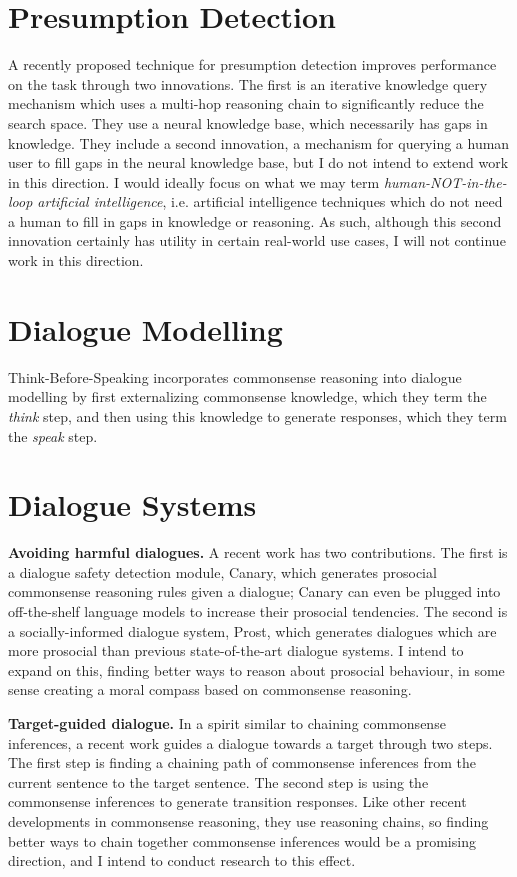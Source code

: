 \documentclass[12pt]{report}
\begin{document}
\section{Presumption Detection}

A recently proposed technique for presumption detection \cite{Arabshahi2021-ly} improves performance on the task through two innovations.
The first is an iterative knowledge query mechanism which uses a multi-hop reasoning chain to significantly reduce the search space.
They use a neural knowledge base, which necessarily has gaps in knowledge.
They include a second innovation, a mechanism for querying a human user to fill gaps in the neural knowledge base, but I do not intend to extend work in this direction.
I would ideally focus on what we may term \textit{human-NOT-in-the-loop artificial intelligence}, i.e. artificial intelligence techniques which do not need a human to fill in gaps in knowledge or reasoning.
As such, although this second innovation certainly has utility in certain real-world use cases, I will not continue work in this direction.

\section{Dialogue Modelling}

Think-Before-Speaking \cite{Zhou2021-iy} incorporates commonsense reasoning into dialogue modelling by first externalizing commonsense knowledge, which they term the \textit{think} step, and then using this knowledge to generate responses, which they term the \textit{speak} step.

\section{Dialogue Systems}

\textbf{Avoiding harmful dialogues.}
A recent work \cite{Kim2022-ji} has two contributions.
The first is a dialogue safety detection module, Canary, which generates prosocial commonsense reasoning rules given a dialogue; Canary can even be plugged into off-the-shelf language models to increase their prosocial tendencies.
The second is a socially-informed dialogue system, Prost, which generates dialogues which are more prosocial than previous state-of-the-art dialogue systems.
I intend to expand on this, finding better ways to reason about prosocial behaviour, in some sense creating a moral compass based on commonsense reasoning.

\textbf{Target-guided dialogue.}
In a spirit similar to chaining commonsense inferences, a recent work \cite{Gupta2022-bs} guides a dialogue towards a target through two steps.
The first step is finding a chaining path of commonsense inferences from the current sentence to the target sentence.
The second step is using the commonsense inferences to generate transition responses.
Like other recent developments in commonsense reasoning, they use reasoning chains, so finding better ways to chain together commonsense inferences would be a promising direction, and I intend to conduct research to this effect.
\end{document}
